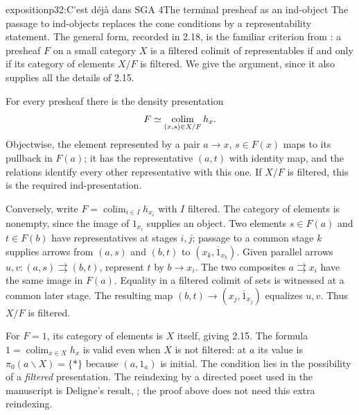 \begin{dcomment}{exposition}{p32:C'est déjà dans SGA 4}{The terminal presheaf as an ind-object}
The passage to ind-objects replaces the cone conditions by a representability statement. The general form, recorded in 2.18, is the familiar criterion from \citet[Expos\'e I, Theorem 8.3.3]{SGA4I1972}: a presheaf $F$ on a small category $X$ is a filtered colimit of representables if and only if its category of elements $X/F$ is filtered. We give the argument, since it also supplies all the details of 2.15.

For every presheaf there is the density presentation
\[
 F\simeq\mathop{\rm colim}_{(x,s)\in X/F}h_x.
\]
Objectwise, the element represented by a pair $a\to x$, $s\in F(x)$ maps to its pullback in $F(a)$; it has the representative $(a,t)$ with identity map, and the relations identify every other representative with this one. If $X/F$ is filtered, this is the required ind-presentation.

Conversely, write $F=\operatorname{colim}_{i\in I}h_{x_i}$ with $I$ filtered. The category of elements is nonempty, since the image of $1_{x_i}$ supplies an object. Two elements $s\in F(a)$ and $t\in F(b)$ have representatives at stages $i,j$; passage to a common stage $k$ supplies arrows from $(a,s)$ and $(b,t)$ to $(x_k,\overline{1}_{x_k})$. Given parallel arrows $u,v:(a,s)\rightrightarrows(b,t)$, represent $t$ by $b\to x_i$. The two composites $a\rightrightarrows x_i$ have the same image in $F(a)$. Equality in a filtered colimit of sets is witnessed at a common later stage. The resulting map $(b,t)\to(x_j,\overline{1}_{x_j})$ equalizes $u,v$. Thus $X/F$ is filtered.

For $F=1$, its category of elements is $X$ itself, giving 2.15. The formula $1=\operatorname{colim}_{x\in X}h_x$ is valid even when $X$ is not filtered: at $a$ its value is $\pi _0(a\backslash X)=\{*\}$ because $(a,1_a)$ is initial. The condition lies in the possibility of a \emph{filtered} presentation. The reindexing by a directed poset used in the manuscript is Deligne's result, \citet[Expos\'e I, Proposition 8.1.6]{SGA4I1972}; the proof above does not need this extra reindexing.
\end{dcomment}

